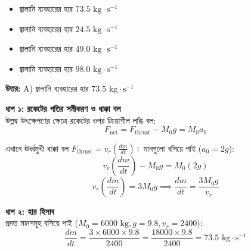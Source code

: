\documentclass[12pt, a4paper]{article}
\begin{document}
\begin{itemize}[label={}, leftmargin=1cm, itemsep=0.5em]
    \item[\textbf{A)}] জ্বালানি ব্যবহারের হার $73.5\text{ kg}\cdot\text{s}^{-1}$
    \item[\textbf{B)}] জ্বালানি ব্যবহারের হার $24.5\text{ kg}\cdot\text{s}^{-1}$
    \item[\textbf{C)}] জ্বালানি ব্যবহারের হার $49.0\text{ kg}\cdot\text{s}^{-1}$
    \item[\textbf{D)}] জ্বালানি ব্যবহারের হার $98.0\text{ kg}\cdot\text{s}^{-1}$
\end{itemize}

\vspace{0.5em}
\begin{tcolorbox}[answerbox]
    \textbf{\color{success} উত্তর:} A) জ্বালানি ব্যবহারের হার $73.5\text{ kg}\cdot\text{s}^{-1}$
\end{tcolorbox}
\vspace{1em}

\begin{tcolorbox}[solutionbox={সমাধান (Solution)}]
    \noindent
    \textbf{ধাপ ১: রকেটের গতির সমীকরণ ও ধাক্কা বল} \\
    উল্লম্ব উৎক্ষেপণের ক্ষেত্রে রকেটের ওপর ক্রিয়াশীল লব্ধি বল:
    \[ F_{\text{net}} = F_{\text{thrust}} - M_0 g = M_0 a_0 \]
    
    এখানে ঊর্ধ্বমুখী ধাক্কা বল $F_{\text{thrust}} = v_r \left(\frac{dm}{dt}\right)$। মানগুলো বসিয়ে পাই ($a_0 = 2g$):
    \[ v_r \left(\frac{dm}{dt}\right) - M_0 g = M_0 (2g) \]
    \[ v_r \left(\frac{dm}{dt}\right) = 3 M_0 g \implies \frac{dm}{dt} = \frac{3 M_0 g}{v_r} \]
    
    \vspace{0.5em}
    \noindent\textbf{ধাপ ২: হার হিসাব} \\
    প্রদত্ত মানসমূহ বসিয়ে পাই ($M_0 = 6000\text{ kg}, g = 9.8, v_r = 2400$):
    \[ \frac{dm}{dt} = \frac{3 \times 6000 \times 9.8}{2400} = \frac{18000 \times 9.8}{2400} = \mathbf{73.5}\text{ kg}\cdot\text{s}^{-1} \]
\end{tcolorbox}

\newpage
\end{document}
